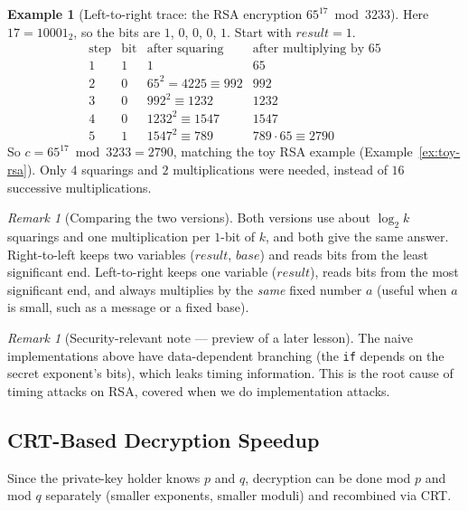 \documentclass[11pt]{article}
\theoremstyle{definition}
\newtheorem{example}[theorem]{Example}
\theoremstyle{remark}
\newtheorem{remark}[theorem]{Remark}
\begin{document}
\begin{example}[Left-to-right trace: the RSA encryption $65^{17}\bmod 3233$]\label{ex:ltr2}
Here $17=10001_2$, so the bits are $1$, $0$, $0$, $0$, $1$. Start with $result=1$.
\[
\begin{array}{c|c|c|c}
\text{step} & \text{bit} & \text{after squaring} & \text{after multiplying by } 65\\
\hline
1 & 1 & 1 & 65\\
2 & 0 & 65^2=4225\equiv992 & 992\\
3 & 0 & 992^2\equiv1232 & 1232\\
4 & 0 & 1232^2\equiv1547 & 1547\\
5 & 1 & 1547^2\equiv789 & 789\cdot65\equiv2790
\end{array}
\]
So $c=65^{17}\bmod3233=2790$, matching the toy RSA example (Example~\ref{ex:toy-rsa}). Only $4$ squarings and $2$ multiplications were needed, instead of $16$ successive multiplications.
\end{example}

\begin{remark}[Comparing the two versions]
Both versions use about $\log_2 k$ squarings and one multiplication per $1$-bit of $k$, and both give the same answer. Right-to-left keeps two variables ($result$, $base$) and reads bits from the least significant end. Left-to-right keeps one variable ($result$), reads bits from the most significant end, and always multiplies by the \emph{same} fixed number $a$ (useful when $a$ is small, such as a message or a fixed base).
\end{remark}

\begin{remark}[Security-relevant note — preview of a later lesson]
The naive implementations above have data-dependent branching (the \texttt{if} depends on the secret exponent's bits), which leaks timing information. This is the root cause of timing attacks on RSA, covered when we do implementation attacks.
\end{remark}



\subsection{CRT-Based Decryption Speedup}\label{sec:crt-speedup}


Since the private-key holder knows $p$ and $q$, decryption can be done mod $p$ and mod $q$ separately (smaller exponents, smaller moduli) and recombined via CRT.
\end{document}
